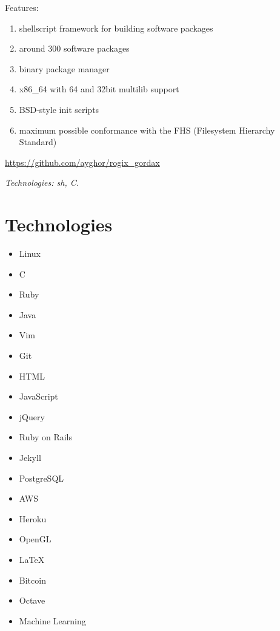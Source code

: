 \documentclass[a4paper]{simplecv}
\begin{document}
\begin{topic}
	Features:

	\begin{enumerate}
		\item shellscript framework for building software packages

		\item around 300 software packages

		\item binary package manager

		\item x86\_64 with 64 and 32bit multilib support

		\item BSD-style init scripts

		\item maximum possible conformance with the FHS (Filesystem
			Hierarchy Standard)
	\end{enumerate}

	{\scriptsize\url{https://github.com/ayghor/rogix\_gordax}}

	{\em\scriptsize Technologies: sh, C.}

\end{topic}

\section{Technologies}

\begin{multicols}{3}
	\raggedcolumns
	\begin{itemize}
		\item Linux
		\item C
		\item Ruby
		\item Java
		\item Vim
		\item Git
		\item HTML
		\item JavaScript
		\item jQuery
		\item Ruby on Rails
		\item Jekyll
		\item PostgreSQL
		\item AWS
		\item Heroku
		\item OpenGL
		\item \LaTeX{}
		\item Bitcoin
		\item Octave
		\item Machine Learning
	\end{itemize}
\end{multicols}
\end{document}

